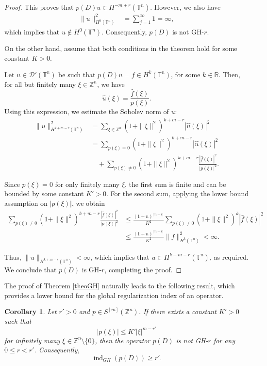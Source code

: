 \documentclass[11pt]{amsart}
\numberwithin{equation}{section}
\newtheorem{corollary}[theorem]{Corollary}
\theoremstyle{definition}
\begin{document}
\begin{proof}
	This proves that \( p(D)u \in H^{-m+r}(\mathbb{T}^n) \). However, we also have  
	\begin{align*}
		\|u\|_{H^0(\mathbb{T}^n)}^2 &= \sum_{j=1}^{\infty} 1 = \infty,
	\end{align*}
	which implies that \( u \notin H^0(\mathbb{T}^n) \). Consequently, \( p(D) \) is not GH-\( r \).

	\medskip
	On the other hand, assume that both conditions in the theorem hold for some constant \( K > 0 \).
	
	Let \( u \in \mathscr{D}'(\mathbb{T}^n) \) be such that \( p(D)u = f \in H^k(\mathbb{T}^n) \), for some \( k \in \mathbb{R} \). Then, for all but finitely many \( \xi \in \mathbb{Z}^n \), we have  
	\[
	\widehat{u}(\xi) = \frac{\widehat{f}(\xi)}{p(\xi)}.
	\]
	Using this expression, we estimate the Sobolev norm of \( u \):  
	\begin{align*}
		\|u\|_{H^{k+m-r}(\mathbb{T}^n)}^2 &= \sum_{\xi \in \mathbb{Z}^n} (1+\|\xi\|^2)^{k+m-r} |\widehat{u}(\xi)|^2 \\
		&= \sum_{p(\xi) = 0} (1+\|\xi\|^2)^{k+m-r} |\widehat{u}(\xi)|^2 \\
		& \quad + \sum_{p(\xi) \neq 0} (1+\|\xi\|^2)^{k+m-r} \frac{|\widehat{f}(\xi)|^2}{|p(\xi)|^2}.
	\end{align*}
	
	Since \( p(\xi) = 0 \) for only finitely many \( \xi \), the first sum is finite and can be bounded by some constant \( K' > 0 \). For the second sum, applying the lower bound assumption on \( |p(\xi)| \), we obtain  
	\begin{align*}
		\sum_{p(\xi) \neq 0} (1+\|\xi\|^2)^{k+m-r} \frac{|\widehat{f}(\xi)|^2}{|p(\xi)|^2}
		&\leq \frac{(1+n)^{|m-r|}}{K^2}  \sum_{p(\xi)\neq 0} (1+\|\xi\|^2)^k |\widehat{f}(\xi)|^2 \\
		&\leq  \frac{(1+n)^{|m-r|}}{K^2} \|f\|_{H^k(\mathbb{T}^n)}^2 < \infty.
	\end{align*}

	
	Thus, \( \|u\|_{H^{k+m-r}(\mathbb{T}^n)} < \infty \), which implies that \( u \in H^{k+m-r}(\mathbb{T}^n) \), as required. 	
	We conclude that \( p(D) \) is GH-\( r \), completing the proof.
	\end{proof}
	
	The proof of Theorem \ref{theoGH} naturally leads to the following result, which provides a lower bound for the global regularization index of an operator.
	
	\begin{corollary}\label{coroGH}
		Let \( r' > 0 \) and \( p \in S^{[m]}(\mathbb{Z}^n) \). 
		If there exists a constant \( K' > 0 \) such that
		\begin{equation}\label{ineq-not-GH-coro}
			|p(\xi)| \leq K'|\xi|^{m - r'}
		\end{equation}
		for infinitely many \( \xi \in \mathbb{Z}^n \setminus \{0\} \), then the operator \( p(D) \) is not GH-\( r \) for any \( 0 \leq r < r' \). 
		Consequently, \[ \operatorname{ind}_{GH}(p(D)) \geq r'. \]
	\end{corollary}
	
\end{document}
